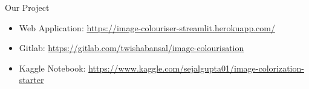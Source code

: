 \documentclass[12pt]{beamer}
\begin{document}
\begin{frame}{Our Project}
	\begin{itemize}
		\item Web Application: \textcolor{cyan}{\href{https://image-colouriser-streamlit.herokuapp.com/}{https://image-colouriser-streamlit.herokuapp.com/}}
		\item Gitlab: \textcolor{cyan}{\href{https://gitlab.com/twishabansal/image-colourisation}{https://gitlab.com/twishabansal/image-colourisation}}
		\item Kaggle Notebook: \textcolor{cyan}{\href{https://www.kaggle.com/sejalgupta01/image-colorization-starter}{https://www.kaggle.com/sejalgupta01/image-colorization-starter}}
	\end{itemize}
\end{frame}

\begin{frame}[standout]
\end{frame}
\end{document}
